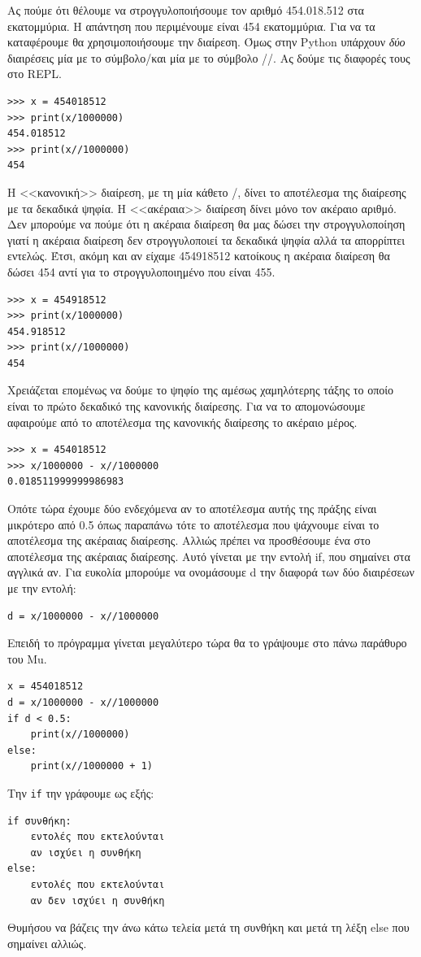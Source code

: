 Ας πούμε ότι θέλουμε να στρογγυλοποιήσουμε τον αριθμό 454.018.512 στα εκατομμύρια. Η απάντηση που περιμένουμε είναι 454 εκατομμύρια.
Για να τα καταφέρουμε θα χρησιμοποιήσουμε την διαίρεση. Όμως στην Python υπάρχουν \emph{δύο} διαιρέσεις μία με το σύμβολο/και μία με το σύμβολο //. Ας δούμε τις διαφορές τους στο REPL.
\begin{lstlisting}
>>> x = 454018512
>>> print(x/1000000)
454.018512
>>> print(x//1000000)
454
\end{lstlisting}
Η <<κανονική>> διαίρεση, με τη μία κάθετο /, δίνει το αποτέλεσμα της διαίρεσης με τα δεκαδικά ψηφία. Η <<ακέραια>> διαίρεση δίνει μόνο τον ακέραιο αριθμό. Δεν μπορούμε να πούμε ότι η ακέραια διαίρεση θα μας δώσει την στρογγυλοποίηση γιατί η ακέραια διαίρεση δεν στρογγυλοποιεί τα δεκαδικά ψηφία αλλά τα απορρίπτει εντελώς. Έτσι, ακόμη και αν είχαμε 454918512 κατοίκους η ακέραια διαίρεση θα δώσει 454 αντί για το στρογγυλοποιημένο που είναι 455.
\begin{lstlisting}
>>> x = 454918512
>>> print(x/1000000)
454.918512
>>> print(x//1000000)
454
\end{lstlisting}

Χρειάζεται επομένως να δούμε το ψηφίο της αμέσως χαμηλότερης τάξης το οποίο είναι το πρώτο δεκαδικό της κανονικής διαίρεσης. Για να το απομονώσουμε αφαιρούμε από το αποτέλεσμα της κανονικής διαίρεσης το ακέραιο μέρος.
\begin{lstlisting}
>>> x = 454018512
>>> x/1000000 - x//1000000
0.018511999999986983
\end{lstlisting}
Οπότε τώρα έχουμε δύο ενδεχόμενα αν το αποτέλεσμα αυτής της πράξης είναι μικρότερο από 0.5 όπως παραπάνω τότε το αποτέλεσμα που ψάχνουμε είναι το αποτέλεσμα της ακέραιας διαίρεσης. Αλλιώς πρέπει να προσθέσουμε ένα στο αποτέλεσμα της ακέραιας διαίρεσης.
Αυτό γίνεται με την εντολή if, που σημαίνει στα αγγλικά αν. Για ευκολία μπορούμε να ονομάσουμε d την διαφορά των δύο διαιρέσεων με την εντολή:
\begin{lstlisting}
d = x/1000000 - x//1000000
\end{lstlisting}
Επειδή το πρόγραμμα γίνεται μεγαλύτερο τώρα θα το γράψουμε στο πάνω παράθυρο του Mu.
\begin{lstlisting}
x = 454018512
d = x/1000000 - x//1000000
if d < 0.5:
    print(x//1000000)
else:
    print(x//1000000 + 1)
\end{lstlisting}
Την \lstinline{if} την γράφουμε ως εξής:
\begin{lstlisting}
if συνθήκη:
    εντολές που εκτελούνται
    αν ισχύει η συνθήκη
else:
    εντολές που εκτελούνται
    αν δεν ισχύει η συνθήκη
\end{lstlisting}
Θυμήσου να βάζεις την άνω κάτω τελεία μετά τη συνθήκη και μετά τη λέξη else που σημαίνει αλλιώς.

